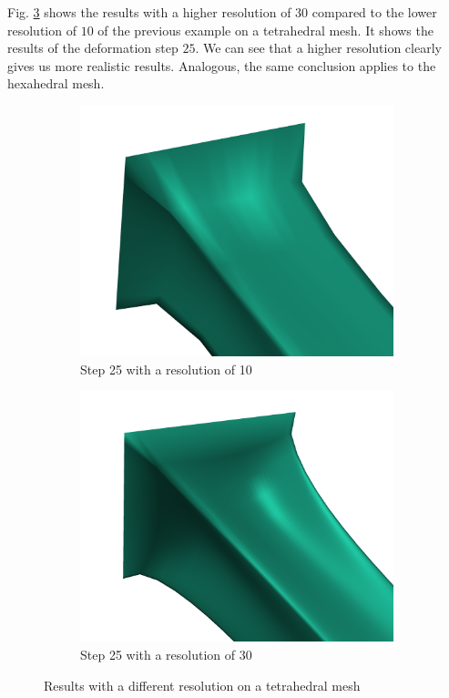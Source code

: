 Fig. \ref{fig:res} shows the results with a higher resolution of $30$ compared to the lower resolution of $10$ of the previous example on a tetrahedral mesh. It shows the results of the deformation step $25$. We can see that a higher resolution clearly gives us more realistic results. Analogous, the same conclusion applies to the hexahedral mesh.
\begin{figure}[!ht]
\centering
\begin{subfigure}{.47\textwidth}
  \centering
  \includegraphics[width=.8\linewidth]{resources/default_zoom_tet.png}  
  \caption{Step 25 with a resolution of 10}
  \label{fig:res_1}
\end{subfigure}
\begin{subfigure}{.47\textwidth}
  \centering
  \includegraphics[width=.8\linewidth]{resources/res_zoom_tet.png}  
  \caption{Step 25 with a resolution of 30}
  \label{fig:res_2}
\end{subfigure}
\caption{Results with a different resolution on a tetrahedral mesh}
\label{fig:res}
\end{figure}

